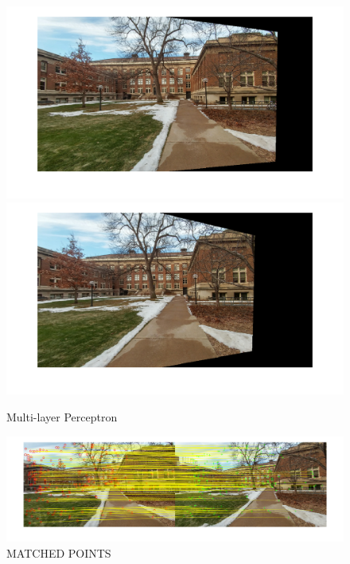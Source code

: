 \documentclass[letter, 10pt]{article}
\begin{document}
\begin{figure}[H]
        \centering
        \includegraphics[width=\textwidth]{HW5/RESULT/im1_w.png}
    \endminipage\hfill
        \centering
        \includegraphics[width=1.1\textwidth]{HW5/RESULT/im2_w.png}
    \endminipage\hfill
    \caption{Multi-layer Perceptron}
\end{figure}

\begin{figure}[H]
    \centering
    \includegraphics[width=\textwidth]{HW5/RESULT/matched_points.png}
    \caption{MATCHED POINTS}
    \label{fig:my_label}
\end{figure}
\end{document}
